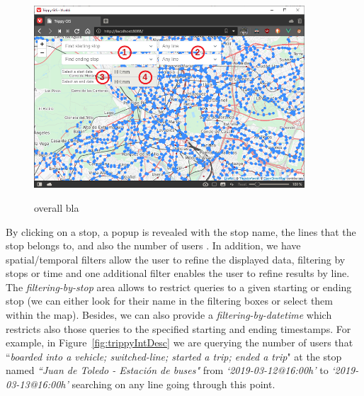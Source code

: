     \begin{figure}[ht]
		\begin{center}
			{\includegraphics[width=0.9\textwidth]{screens/overall.png}}
		\end{center}
		\caption{overall bla}
		\label{fig:ui:overall}
	\end{figure}
	
	By clicking on a stop, a popup is revealed with the stop name, the lines that the stop belongs to, and also the number of users . In addition, we have spatial/temporal filters allow the user to refine the displayed data, filtering by stops or time and one additional filter enables the user to refine results by line. The {\em filtering-by-stop} area allows to restrict queries to a given starting or ending stop (we can either look for their name in the filtering boxes or select them within the map). Besides, we can also provide a {\em filtering-by-datetime} which restricts also those queries to the specified starting and ending timestamps. For example, in Figure~\ref{fig:trippyIntDesc} we are querying the number of users that ``{\em boarded into a vehicle; switched-line; started a trip; ended a trip}" at the stop named {\em ``Juan de Toledo - Estaci\'on de buses"} from {\em `2019-03-12@16:00h'} to {\em `2019-03-13@16:00h'} searching on any line going through this point.
	
